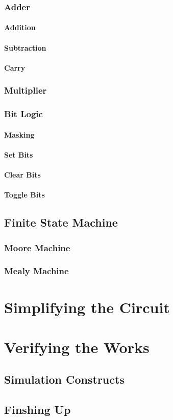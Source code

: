 \documentclass[a4paper,11pt]{book}
\begin{document}
\section{Adder}
\subsection{Addition}
\subsection{Subtraction}
\subsection{Carry}
\section{Multiplier}
\section{Bit Logic}
\subsection{Masking}
\subsection{Set Bits}
\subsection{Clear Bits}
\subsection{Toggle Bits}

\chapter{Finite State Machine}
\section{Moore Machine}
\section{Mealy Machine}

\part{Simplifying the Circuit}

\part{Verifying the Works}

\chapter{Simulation Constructs}
\chapter{Finshing Up}

\backmatter
% 
\end{document}
